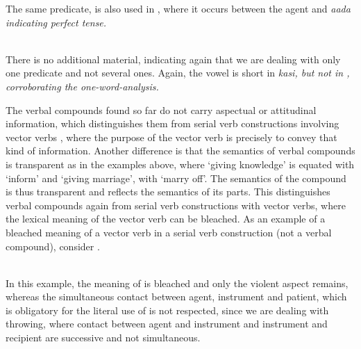 The same predicate,  is also used in , where it occurs between the agent  and \em aada \em indicating perfect tense.

 \\ 
There is no additional material, indicating again that we are dealing with only one predicate and not several ones. Again, the vowel is short in \em kasi\em, but not in , corroborating the one-word-analysis.

The verbal compounds found so far do not carry aspectual or attitudinal information, which distinguishes them from serial verb constructions involving vector verbs , where the  purpose of the vector verb is precisely to convey that kind of information. Another difference is that the semantics of verbal compounds is transparent as in the examples above, where `giving knowledge' is equated with `inform' and `giving marriage', with `marry off'. The semantics of the compound is thus transparent and reflects the semantics of its parts.  This distinguishes verbal compounds again from serial verb constructions with vector verbs, where the lexical meaning of the vector verb can be bleached.
As an example of a bleached meaning of a vector verb in a serial verb construction (not a verbal compound), consider .

\\ 

In this example, the meaning of  is bleached and only the violent aspect remains, whereas the simultaneous contact between agent, instrument and patient, which is obligatory for the literal use of  is not respected, since we are dealing with throwing, where contact between agent and instrument and instrument and recipient are successive and not simultaneous.

